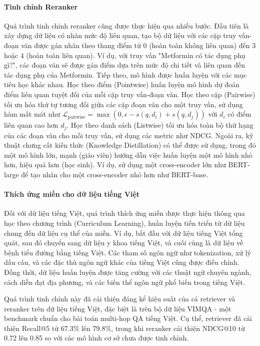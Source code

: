 \paragraph{Tinh chỉnh Reranker}
Quá trình tinh chỉnh reranker cũng được thực hiện qua nhiều bước. Đầu tiên là xây dựng dữ liệu có nhãn mức độ liên quan, tạo bộ dữ liệu với các cặp truy vấn-đoạn văn được gán nhãn theo thang điểm từ 0 (hoàn toàn không liên quan) đến 3 hoặc 4 (hoàn toàn liên quan). Ví dụ, với truy vấn "Metformin có tác dụng phụ gì?", các đoạn văn sẽ được gán điểm dựa trên mức độ chi tiết và liên quan đến tác dụng phụ của Metformin. Tiếp theo, mô hình được huấn luyện với các mục tiêu học khác nhau. Học theo điểm (Pointwise) huấn luyện mô hình dự đoán điểm liên quan tuyệt đối của mỗi cặp truy vấn-đoạn văn. Học theo cặp (Pairwise) tối ưu hóa thứ tự tương đối giữa các cặp đoạn văn cho một truy vấn, sử dụng hàm mất mát như $\mathcal{L}_{\text{pairwise}} = \max(0, \epsilon - s(q, d_i) + s(q, d_j))$ với $d_i$ có điểm liên quan cao hơn $d_j$. Học theo danh sách (Listwise) tối ưu hóa toàn bộ thứ hạng của các đoạn văn cho mỗi truy vấn, sử dụng các metric như NDCG. Ngoài ra, kỹ thuật chưng cất kiến thức (Knowledge Distillation) có thể được sử dụng, trong đó một mô hình lớn, mạnh (giáo viên) hướng dẫn việc huấn luyện một mô hình nhỏ hơn, hiệu quả hơn (học sinh). Ví dụ, sử dụng một cross-encoder lớn như BERT-large để tạo nhãn cho một cross-encoder nhỏ hơn như BERT-base.

\paragraph{Thích ứng miền cho dữ liệu tiếng Việt}
Đối với dữ liệu tiếng Việt, quá trình thích ứng miền được thực hiện thông qua học theo chương trình (Curriculum Learning), huấn luyện tiến triển từ dữ liệu chung đến dữ liệu cụ thể của miền. Ví dụ, bắt đầu với dữ liệu tiếng Việt tổng quát, sau đó chuyển sang dữ liệu y khoa tiếng Việt, và cuối cùng là dữ liệu về bệnh tiểu đường bằng tiếng Việt. Các tham số ngôn ngữ như tokenization, xử lý dấu câu, và các đặc thù ngôn ngữ khác của tiếng Việt cũng được điều chỉnh. Đồng thời, dữ liệu huấn luyện được tăng cường với các thuật ngữ chuyên ngành, cách diễn đạt địa phương, và các biến thể ngôn ngữ phổ biến trong tiếng Việt.

Quá trình tinh chỉnh này đã cải thiện đáng kể hiệu suất của cả retriever và reranker trên dữ liệu tiếng Việt, đặc biệt là trên bộ dữ liệu VIMQA - một benchmark chuẩn cho bài toán multi-hop QA tiếng Việt. Cụ thể, retriever đã cải thiện Recall@5 từ 67.3\% lên 79.8\%, trong khi reranker cải thiện NDCG@10 từ 0.72 lên 0.85 so với các mô hình cơ sở chưa được tinh chỉnh.

